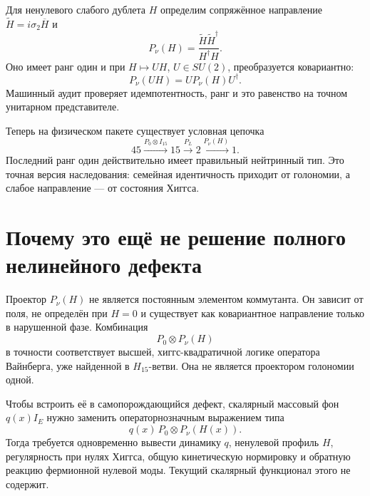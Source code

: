 Для ненулевого слабого дублета $H$ определим сопряжённое направление
$\widetilde H=i\sigma_2\overline H$ и
\begin{equation}
 P_\nu(H)=
 \frac{\widetilde H\widetilde H^\dagger}{H^\dagger H}.
 \label{eq:v5-higgs-neutrino-projector}
\end{equation}
Оно имеет ранг один и при $H\mapsto UH$, $U\in SU(2)$, преобразуется
ковариантно:
\begin{equation}
 P_\nu(UH)=U P_\nu(H)U^\dagger.
 \label{eq:v5-higgs-projector-covariance}
\end{equation}
Машинный аудит проверяет идемпотентность, ранг и это равенство на точном
унитарном представителе.

Теперь на физическом пакете существует условная цепочка
\begin{equation}
 45
 \xrightarrow{P_0\otimes I_{15}}15
 \xrightarrow{P_L}2
 \xrightarrow{P_\nu(H)}1.
 \label{eq:v5-projector-rank-chain}
\end{equation}
Последний ранг один действительно имеет правильный нейтринный тип. Это
точная версия наследования: семейная идентичность приходит от голономии,
а слабое направление --- от состояния Хиггса.

\section{Почему это ещё не решение полного нелинейного дефекта}

Проектор $P_\nu(H)$ не является постоянным элементом коммутанта. Он
зависит от поля, не определён при $H=0$ и существует как ковариантное
направление только в нарушенной фазе. Комбинация
\begin{equation}
 P_0\otimes P_\nu(H)
 \label{eq:v5-combined-neutrino-projector}
\end{equation}
в точности соответствует высшей, хиггс-квадратичной логике оператора
Вайнберга, уже найденной в $H_{15}$-ветви. Она не является проектором
голономии одной.

Чтобы встроить её в самопорождающийся дефект, скалярный массовый фон
$q(x)I_E$ нужно заменить операторнозначным выражением типа
\begin{equation}
 q(x)\,P_0\otimes P_\nu(H(x)).
 \label{eq:v5-operator-valued-defect-candidate}
\end{equation}
Тогда требуется одновременно вывести динамику $q$, ненулевой профиль
$H$, регулярность при нулях Хиггса, общую кинетическую нормировку и
обратную реакцию фермионной нулевой моды. Текущий скалярный функционал
этого не содержит.


